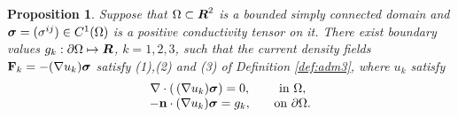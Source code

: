 \documentclass[11pt]{amsart}
\theoremstyle{plain}
\newtheorem{Prop}[Thm]{Proposition}
\numberwithin{equation}{section}
\numberwithin{Thm}{section}
\def\R{\mbox{\boldmath$R$}}
\def\F{{\bf F}}
\def\n{{\bf n}}
\def\ds{\displaystyle}
\def\Sigma{\mbox{\boldmath$\sigma$}}
\begin{document}
\begin{Prop} \label{thm:anisoadm}
Suppose that $\Omega\subset\R^2$ is a bounded simply connected domain and $\Sigma=(\sigma^{ij})\in C^1(\Omega)$ is a positive conductivity tensor on it. There exist boundary values $g_k:\partial\Omega\mapsto\R$, $k=1,2,3$, such that the current density fields $\F_k = -(\nabla u_k)\Sigma$ satisfy (1),(2) and (3) of Definition \ref{def:adm3}, where $u_k$ satisfy
\begin{equation}\label{Eqn3.2}
\begin{array}{cc}\ds
\nabla\cdot(\,(\nabla u_k)\Sigma)  =0, &\quad \text{in $\Omega$},\\
-\n\cdot(\nabla u_k)\Sigma=g_k, &\quad \text{on $\partial\Omega$}.
\end{array}
\end{equation}
\end{Prop}
\end{document}
